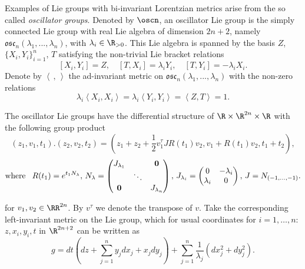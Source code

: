 \documentclass[12pt]{amsart}
\newcommand{\lela}{\left \langle}
\newcommand{\rira}{\right \rangle}
\theoremstyle{plain}
\theoremstyle{definition}
\theoremstyle{remark}
\begin{document}
			
	
	
	
	
	Examples of Lie groups with bi-invariant Lorentzian metrics arise from the so called  \textit{oscillator groups}. Denoted by $\oscn$, an oscillator Lie group is the simply connected Lie group with real Lie algebra of dimension $2n+2$, namely $\mathfrak{osc}_n(\lambda_1,...,\lambda_n)$, with $\lambda_i\in \R_{>0}$. This Lie algebra is  spanned by the basis $Z$,$\{X_i,Y_i\}_{i=1}^n$, $T$ satisfying the non-trivial Lie bracket relations
	\[ [X_i,Y_i]=Z, \quad [T, X_i]=\lambda_i Y_i, \quad  [T, Y_i]=- \lambda_i X_i.  \]
Denote by $\lela\,,\, \rira$  the ad-invariant  metric on $\mathfrak{osc}_n(\lambda_1,...,\lambda_n)$ with  the non-zero relations
	\[ \lambda_i \lela X_i,X_i \rira  = \lambda_i \lela Y_i,Y_i \rira = \lela Z,T  \rira  = 1.\]
	
	The oscillator Lie groups   have the differential structure of $\R \times \R^{2n} \times \R$ with the following group product
	\begin{equation*}
		(z_1,v_1,t_1) . (z_2,v_2,t_2)=(z_1+z_2+\frac{1}{2}v_1^{\tau}J R(t_1)v_2,v_1+R(t_1)v_2,t_1+t_2),
	\end{equation*}
	\[\text{where \,  } 
	R(t_1)= e^{t_1 N_{\lambda}}, \, N_\lambda=\left( \begin{matrix}
		J_{\lambda_1} &  & \mathbf{0} \\
		& \ddots & \\
		\mathbf{0} & & J_{\lambda_n}
	\end{matrix} \right),\, 
	J_{\lambda_i}=\left( \begin{matrix}
		0 & -\lambda_i \\
		\lambda_i & 0
	\end{matrix} \right), \, J = N_{(-1, \hdots, -1)}.
	\]
	
	for $v_1, v_2\in \RR^{2n}$. By $v^{\tau}$ we denote the transpose of $v$. 
	Take the corresponding left-invariant metric on the Lie group, which for usual  coordinates for $i=1, \hdots, n$: $z, x_i,y_i, t$ in $\R^{2n+2}$  can be written as
	\begin{equation}\label{metricosc}
		g=dt (dz +\sum_{j=1}^{n} y_j dx_j+ x_j dy_j) +\sum_{j=1}^{n}\frac1{\lambda_j}(dx_j^2+dy_j^2).
	\end{equation}
	
\end{document}

